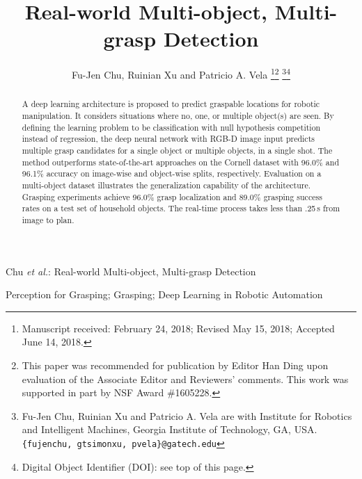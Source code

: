 \documentclass[letterpaper, 10 pt, journal, twoside]{IEEEtran}
\begin{document}
\title{
Real-world Multi-object, Multi-grasp Detection
}

\author{Fu-Jen Chu, Ruinian Xu and Patricio A. Vela
\thanks{Manuscript received: February 24, 2018; Revised May 15, 2018; Accepted June 14, 2018.}\thanks{This paper was recommended for publication by Editor Han Ding upon evaluation of the Associate Editor and Reviewers' comments.
This work was supported in part by NSF Award \#1605228.} \thanks{Fu-Jen Chu, Ruinian Xu and Patricio A. Vela are with Institute for Robotics and Intelligent Machines, 
    Georgia Institute of Technology, GA, USA.
    {\tt\footnotesize \{fujenchu, gtsimonxu, pvela\}@gatech.edu}}\thanks{Digital Object Identifier (DOI): see top of this page.}
}


{Chu \MakeLowercase{\textit{et al.}}: Real-world Multi-object, Multi-grasp Detection} 







\maketitle



\begin{abstract}
A deep learning architecture is proposed to predict graspable locations for
robotic manipulation. It considers situations where no, one, or multiple 
object(s) are seen. By defining the learning problem to be classification
with null hypothesis competition instead of regression, the deep neural
network with RGB-D image input predicts multiple grasp candidates for a
single object or multiple objects, in a single shot. 
The method outperforms state-of-the-art approaches on the Cornell dataset
with 96.0\% and 96.1\% accuracy on image-wise and object-wise splits,
respectively. 
Evaluation on a multi-object dataset illustrates the generalization
capability of the architecture.
Grasping experiments achieve 96.0\% grasp localization and 
89.0\% grasping success rates on a test set of household objects.  
The real-time process takes less than .25\,s from image to plan.
\end{abstract}
\begin{IEEEkeywords}
Perception for Grasping; Grasping; Deep Learning in Robotic Automation
\end{IEEEkeywords}
\IEEEpeerreviewmaketitle
\end{document}
